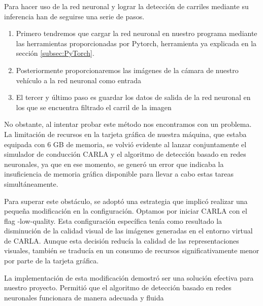 \bigskip

Para hacer uso de la red neuronal y lograr la detección de carriles mediante su inferencia han de seguirse una serie de pasos.

\begin{enumerate}
    \item Primero tendremos que cargar la red neuronal en nuestro programa mediante las herramientas proporcionadas por Pytorch, herramienta ya explicada en la sección \ref{subsec:PyTorch}.
    \item Posteriormente proporcionaremos las imágenes de la cámara de nuestro vehículo a la red neuronal como entrada
    \item El tercer y último paso es guardar los datos de salida de la red neuronal en los que se encuentra filtrado el carril de la imagen
\end{enumerate}

\bigskip

No obstante, al intentar probar este método nos encontramos con un problema. La limitación de recursos en la tarjeta gráfica de nuestra máquina, que estaba equipada con 6 GB de memoria, se volvió evidente al lanzar conjuntamente el simulador de conducción CARLA y el algoritmo de detección basado en redes neuronales, ya que en ese momento, se generó un error que indicaba la insuficiencia de memoria gráfica disponible para llevar a cabo estas tareas simultáneamente.

\bigskip

Para superar este obstáculo, se adoptó una estrategia que implicó realizar una pequeña modificación en la configuración. Optamos por iniciar CARLA con el flag -low-quality. Esta configuración específica tenía como resultado la disminución de la calidad visual de las imágenes generadas en el entorno virtual de CARLA. Aunque esta decisión reducía la calidad de las representaciones visuales, también se traducía en un consumo de recursos significativamente menor por parte de la tarjeta gráfica. 

\bigskip

La implementación de esta modificación demostró ser una solución efectiva para nuestro proyecto. Permitió que el algoritmo de detección basado en redes neuronales funcionara de manera adecuada y fluida

\bigskip

